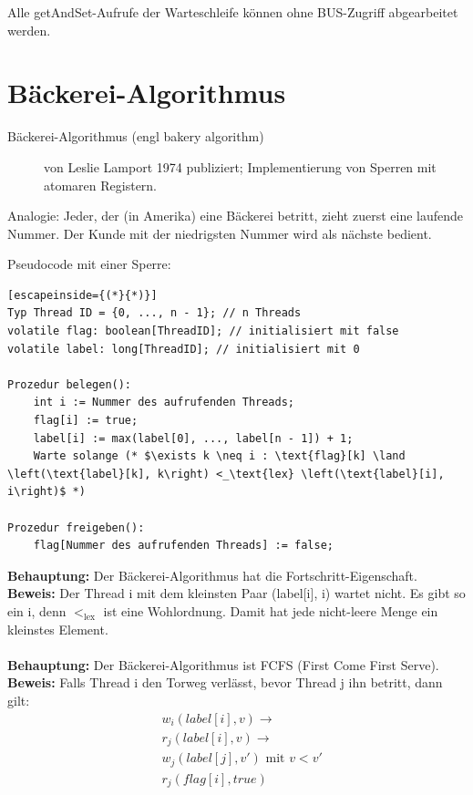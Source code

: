 Alle getAndSet-Aufrufe der Warteschleife können ohne BUS-Zugriff abgearbeitet werden.

\section{Bäckerei-Algorithmus}
\begin{description}
	\item[Bäckerei-Algorithmus (engl bakery algorithm)] von Leslie Lamport 1974 publiziert; Implementierung von Sperren mit atomaren Registern.
\end{description}

Analogie: Jeder, der (in Amerika) eine Bäckerei betritt, zieht zuerst eine laufende Nummer. Der Kunde mit der niedrigsten Nummer wird als nächste bedient.
\pagebreak

Pseudocode mit einer Sperre:
\begin{lstlisting}[escapeinside={(*}{*)}]
Typ Thread ID = {0, ..., n - 1}; // n Threads
volatile flag: boolean[ThreadID]; // initialisiert mit false
volatile label: long[ThreadID]; // initialisiert mit 0

Prozedur belegen():
    int i := Nummer des aufrufenden Threads;
    flag[i] := true;
    label[i] := max(label[0], ..., label[n - 1]) + 1;
    Warte solange (* $\exists k \neq i : \text{flag}[k] \land \left(\text{label}[k], k\right) <_\text{lex} \left(\text{label}[i], i\right)$ *)
    
Prozedur freigeben():
    flag[Nummer des aufrufenden Threads] := false;
\end{lstlisting}
\textbf{Behauptung:} Der Bäckerei-Algorithmus hat die Fortschritt-Eigenschaft.\\
\textbf{Beweis:} Der Thread i mit dem kleinsten Paar (label[i], i) wartet nicht. Es gibt so ein i, denn $<_\text{lex}$ ist eine Wohlordnung. Damit hat jede nicht-leere Menge ein kleinstes Element.\\
\\
\textbf{Behauptung:} Der Bäckerei-Algorithmus ist FCFS (First Come First Serve).\\
\textbf{Beweis:} Falls Thread i den Torweg verlässt, bevor Thread j ihn betritt, dann gilt:
\begin{align*}
	& w_i\left(label[i], v\right) \rightarrow\\
	& r_j\left(label[i], v\right) \rightarrow\\
	& w_j\left(label[j], v'\right) \text{ mit } v < v'\\
	& r_j\left(flag[i], true\right)
\end{align*}
